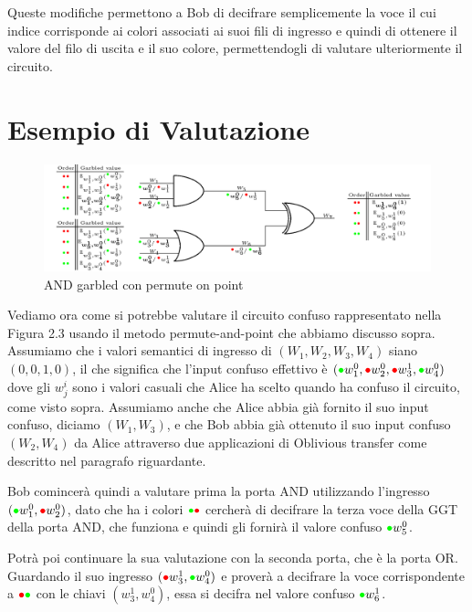 \documentclass[
  italian,
]{book}
\begin{document}
Queste modifiche permettono a Bob di decifrare semplicemente la voce il cui indice corrisponde ai colori associati ai suoi fili di ingresso e quindi di ottenere il valore del filo di uscita e il suo colore, permettendogli di valutare ulteriormente il circuito.

\hypertarget{esempio-di-valutazione}{%
\section{Esempio di Valutazione}\label{esempio-di-valutazione}}

\begin{figure}
\centering
\includegraphics{./media/03.png}
\caption{AND garbled con permute on point}
\end{figure}

Vediamo ora come si potrebbe valutare il circuito confuso rappresentato nella Figura 2.3 usando il metodo permute-and-point che abbiamo discusso sopra. Assumiamo che i valori semantici di ingresso di \((W_1,W_2,W_3,W_4)\) siano \((0,0,1,0)\), il che significa che l'input confuso effettivo è \(({\color{green}\bullet}{}w_1^0,{\color{red}\bullet}{}w_2^0,{\color{red}\bullet}{}w_3^1,{\color{green}\bullet}{}w_4^0)\) dove gli \(w^i_j\) sono i valori casuali che Alice ha scelto quando ha confuso il circuito, come visto sopra. Assumiamo anche che Alice abbia già fornito il suo input confuso, diciamo \((W_1,W_3)\), e che Bob abbia già ottenuto il suo input confuso \((W_2,W_4)\) da Alice attraverso due applicazioni di Oblivious transfer come descritto nel paragrafo riguardante.

Bob comincerà quindi a valutare prima la porta AND utilizzando l'ingresso \(({\color{green}\bullet}{}w_1^0,{\color{red}\bullet}{}w_2^0)\), dato che ha i colori \(\color{green}\bullet\color{red}\bullet\) cercherà di decifrare la terza voce della GGT della porta AND, che funziona e quindi gli fornirà il valore confuso \({\color{green}\bullet}{}w_5^0\).

Potrà poi continuare la sua valutazione con la seconda porta, che è la porta OR. Guardando il suo ingresso \(({\color{red}\bullet}{}w_3^1,{\color{green}\bullet}{}w_4^0)\) e proverà a decifrare la voce corrispondente a \(\color{red}\bullet\color{green}\bullet\) con le chiavi \((w_3^1,w_4^0)\), essa si decifra nel valore confuso \({\color{green}\bullet}{}w_6^1\).
\end{document}

